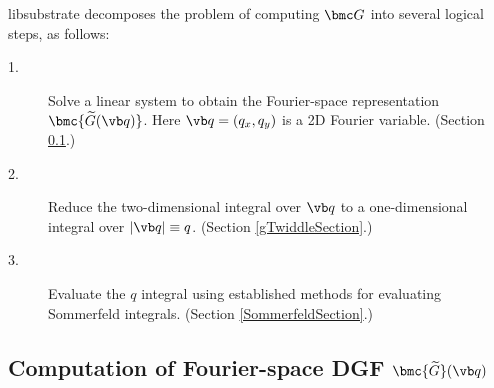 \documentclass[letterpaper]{article}
\renewcommand{\wt}{\widetilde}
\begin{document}
{\sc libsubstrate} decomposes the problem of computing
$\bmc G$ into several logical steps, as follows:

\begin{description}
 \item[1.] Solve a linear system to obtain the Fourier-space
             representation $\bmc{\wt G(\vb q)}$. Here $\vb q=(q_x,q_y)$ is a
             2D Fourier variable. (Section \ref{GTwiddleSection}.)
 \item[2.] Reduce the two-dimensional integral over $\vb q$ to a
             one-dimensional integral over $|\vb q|\equiv q$.
             (Section \ref{gTwiddleSection}.)
 \item[3.] Evaluate the $q$ integral using established methods for
             evaluating Sommerfeld integrals.
             (Section \ref{SommerfeldSection}.)
\end{description}

\newpage
\subsection{Computation of Fourier-space DGF $\bmc{\wt G}(\vb q)$}
\label{GTwiddleSection}
\end{document}
